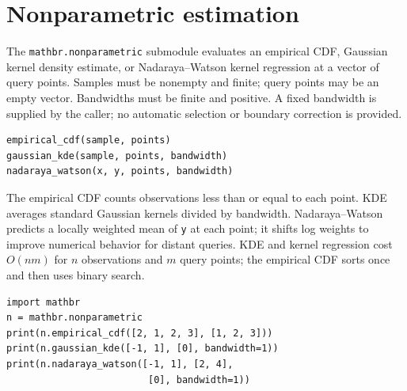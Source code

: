 \documentclass[11pt,a4paper]{article}
\begin{document}
\section{Nonparametric estimation}
The \verb|mathbr.nonparametric| submodule evaluates an empirical CDF, Gaussian kernel density estimate, or Nadaraya--Watson kernel regression at a vector of query points. Samples must be nonempty and finite; query points may be an empty vector. Bandwidths must be finite and positive. A fixed bandwidth is supplied by the caller; no automatic selection or boundary correction is provided.
\begin{verbatim}
empirical_cdf(sample, points)
gaussian_kde(sample, points, bandwidth)
nadaraya_watson(x, y, points, bandwidth)
\end{verbatim}
The empirical CDF counts observations less than or equal to each point. KDE averages standard Gaussian kernels divided by bandwidth. Nadaraya--Watson predicts a locally weighted mean of \verb|y| at each point; it shifts log weights to improve numerical behavior for distant queries. KDE and kernel regression cost $O(nm)$ for $n$ observations and $m$ query points; the empirical CDF sorts once and then uses binary search.
\begin{verbatim}
import mathbr
n = mathbr.nonparametric
print(n.empirical_cdf([2, 1, 2, 3], [1, 2, 3]))
print(n.gaussian_kde([-1, 1], [0], bandwidth=1))
print(n.nadaraya_watson([-1, 1], [2, 4],
                         [0], bandwidth=1))
\end{verbatim}
\end{document}

